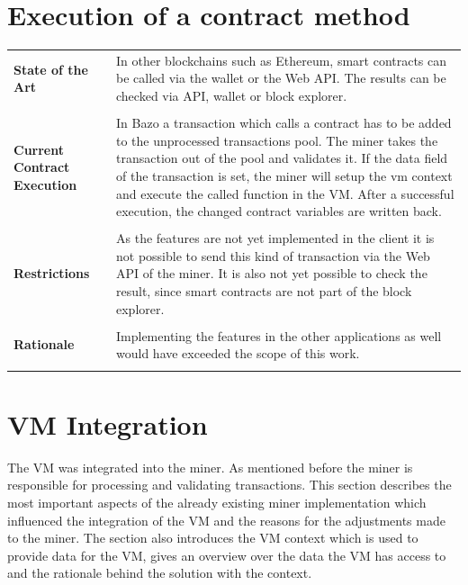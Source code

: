 \section{Execution of a contract method}
\begin{tabular}[t]{ p{3cm} p{12.5cm}}
\raggedright
\textbf{State of the Art} &
In other blockchains such as Ethereum, smart contracts can be called via the wallet or the Web API. The results can be checked via API, wallet or block explorer. \\ \\
\raggedright
\textbf{Current Contract Execution} &
In Bazo a transaction which calls a contract has to be added to the unprocessed transactions pool. The miner takes the transaction out of the pool and validates it. If the data field of the transaction is set, the miner will setup the vm context and execute the called function in the VM. After a successful execution, the changed contract variables are written back. \\ \\

\raggedright
\textbf{Restrictions} &
As the features are not yet implemented in the client it is not possible to send this kind of transaction via the Web API of the miner. It is also not yet possible to check the result, since smart contracts are not part of the block explorer. \\ \\

\raggedright
\textbf{Rationale} &
Implementing the features in the other applications as well would have exceeded the scope of this work. \\ \\
\end{tabular}

\pagebreak

\section{VM Integration} \label{design_miner}
The VM was integrated into the miner. As mentioned before the miner is responsible for processing and validating transactions. This section describes the most important aspects of the already existing miner implementation which influenced the integration of the VM and the reasons for the adjustments made to the miner. The section also introduces the VM context which is used to provide data for the VM, gives an overview over the data the VM has access to and the rationale behind the solution with the context.

